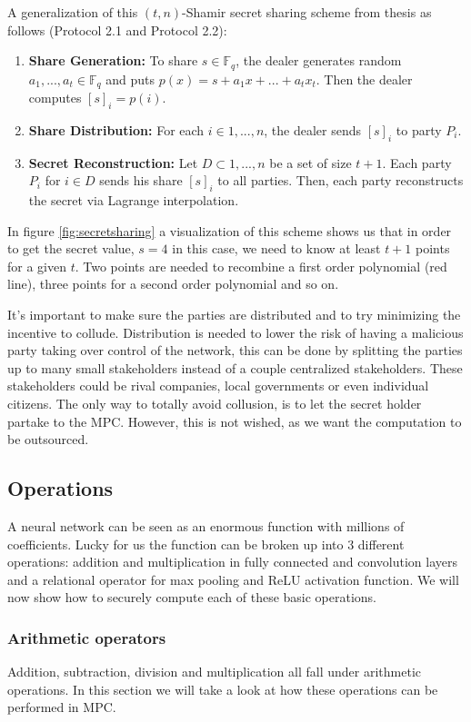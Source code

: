 A generalization of this $(t,n)$-Shamir secret sharing scheme from thesis \cite{de2012design} as follows (Protocol 2.1 and Protocol 2.2):
\begin{enumerate}
  \item \textbf{Share Generation:} To share $s \in \mathbb{F}_q$, the dealer generates random $a_1, ..., a_t \in \mathbb{F}_q$ and puts $p(x) = s + a_1x + ... + a_tx_t$. Then the dealer computes $[s]_i = p(i)$.
  \item \textbf{Share Distribution:} For each $i \in {1, ..., n}$, the dealer sends $[s]_i$ to party $P_i$.
  \item \textbf{Secret Reconstruction:} Let $D \subset {1, ..., n}$ be a set of size $t + 1$. Each party $P_i$ for $i \in D$ sends his share $[s]_i$ to all parties. Then, each party reconstructs the secret via Lagrange interpolation.
\end{enumerate}
In figure \ref{fig:secretsharing} a visualization of this scheme shows us that in order to get the secret value, $s=4$ in this case, we need to know at least $t+1$ points for a given $t$. Two points are needed to recombine a first order polynomial (red line), three points for a second order polynomial and so on.

It's important to make sure the parties are distributed and to try minimizing the incentive to collude. Distribution is needed to lower the risk of having a malicious party taking over control of the network, this can be done by splitting the parties up to many small stakeholders instead of a couple centralized stakeholders. These stakeholders could be rival companies, local governments or even individual citizens. The only way to totally avoid collusion, is to let the secret holder partake to the MPC.  However, this is not wished, as we want the computation to be outsourced.

\subsection{Operations}
A neural network can be seen as an enormous function with millions of coefficients. Lucky for us the function can be broken up into 3 different operations: addition and multiplication in fully connected and convolution layers and a relational operator for max pooling and ReLU activation function. We will now show how to securely compute each of these basic operations.

\subsubsection{Arithmetic operators}
\label{Arithmetic operators}
Addition, subtraction, division and multiplication all fall under arithmetic operations. In this section we will take a look at how these operations can be performed in MPC.
